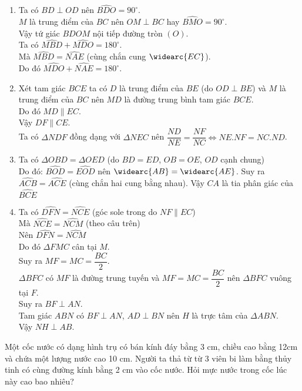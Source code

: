 \begin{ex}
{\begin{enumerate}
\item Ta có $BD \perp OD$ nên $\widehat{BDO}=90^{\circ}$.\\
$M$ là trung điểm của $BC$ nên $OM \perp BC$ hay $\widehat{BMO}=90^\circ$.\\
Vậy tứ giác $BDOM$ nội tiếp đường tròn $(O)$.\\
Ta có $\widehat{MBD}+\widehat{MDO}=180^\circ$.\\
Mà $\widehat{MBD}=\widehat{NAE}$ (cùng chắn cung $\widearc{EC}$).\\
Do đó  $\widehat{MDO}+\widehat{NAE}=180^\circ$.
\item Xét tam giác $BCE$ ta có $D$ là trung điểm của $BE$ (do $OD \perp BE$) và $M$ là trung điểm của $BC$ nên $MD$ là đường trung bình tam giác $BCE$.\\
Do đó $MD \parallel EC$.\\
Vậy $DF \parallel CE$.\\
Ta có $\Delta NDF$ đồng dạng với $\Delta NEC$ nên $\dfrac{ND}{NE}=\dfrac{NF}{NC}\Leftrightarrow NE.NF=NC.ND$. 
\item Ta có $\Delta OBD =\Delta OED$ (do $BD=ED$, $OB=OE$, $OD$ cạnh chung)\\
Do đó: $\widehat{BOD}=\widehat{EOD}$ nên $\widearc{AB}=\widearc{AE}$. Suy ra $\widehat{ACB}=\widehat{ACE}$ (cùng chắn hai cung bằng nhau). Vậy $CA$ là tia phân giác của $\widehat{BCE}$
\item Ta có $\widehat{DFN}=\widehat{NCE}$ (góc sole trong do $NF \parallel EC$)\\
Mà $\widehat{NCE}=\widehat{NCM}$ (theo câu trên)\\
Nên $\widehat{DFN}=\widehat{NCM}$\\
Do đó $\Delta FMC$ cân tại $M$.\\
Suy ra $MF=MC=\dfrac{BC}{2}$.\\
$\Delta BFC$ có $MF$ là đường trung tuyến và $MF=MC=\dfrac{BC}{2}$ nên $\Delta BFC$ vuông tại $F$.\\
Suy ra $BF \perp AN$.\\
Tam giác $ABN$ có $BF \perp AN$, $AD \perp BN$ nên $H$ là trực tâm của $\Delta ABN$.\\
Vậy $NH \perp AB$.
\end{enumerate}
}
\end{ex}

\begin{ex}%
Một cốc nước có dạng hình trụ có bán kính đáy bằng 3 cm, chiều cao bằng 12cm và chứa một lượng nước cao 10 cm. Người ta thả từ từ 3 viên bi làm bằng thủy tinh có cùng đường kính bằng 2 cm vào cốc nước. Hỏi mực nước trong cốc lúc này cao bao nhiêu? 
\end{ex}
